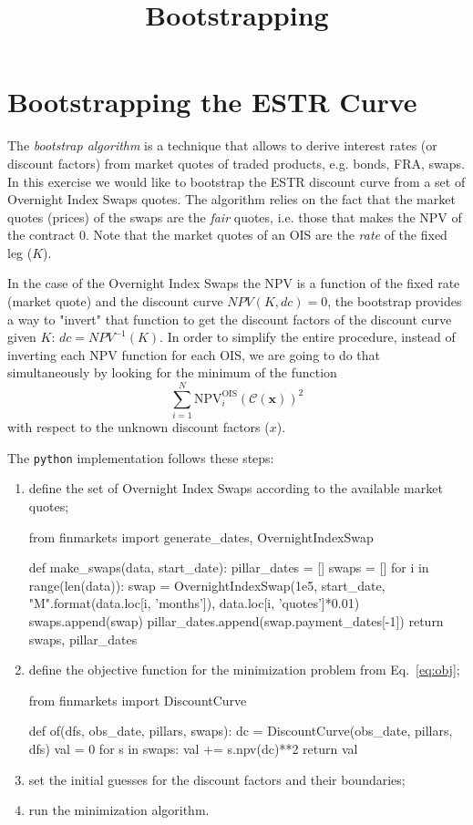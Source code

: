 \documentclass[]{article}
\title{Bootstrapping}
\author{}
\begin{document}
\maketitle

\section{Bootstrapping the ESTR Curve}
The \emph{bootstrap algorithm} is a technique that allows to derive interest rates (or discount factors) from market quotes of traded products, e.g. bonds, FRA, swaps.
In this exercise we would like to bootstrap the ESTR discount curve from a set of Overnight Index Swaps quotes. The algorithm relies on the fact that the market quotes (prices) of the swaps are the \emph{fair} quotes, i.e. those that makes the NPV of the contract 0. Note that the market quotes of an OIS are the \emph{rate} of the fixed leg ($K$). 

In the case of the Overnight Index Swaps the NPV is a function of the fixed rate (market quote) and the discount curve $NPV(K, dc)=0$, the bootstrap provides a way to "invert" that function to get the discount factors of the discount curve given $K$: $dc = NPV^{-1}(K)$.
In order to simplify the entire procedure, instead of inverting each NPV function for each OIS, we are going to do that simultaneously by looking for the minimum of the function 
\begin{equation}
\sum_{i=1}^{N}\mathrm{NPV}^\mathrm{OIS}_i( \mathcal{C}(\mathbf{x}))^2
\label{eq:obj}
\end{equation}
with respect to the unknown discount factors ($x$).

The \texttt{python} implementation follows these steps:
\begin{enumerate}
	\item define the set of Overnight Index Swaps according to the available market quotes;
\begin{ipython}
from finmarkets import generate_dates, OvernightIndexSwap

def make_swaps(data, start_date):
    pillar_dates = []
    swaps = []
    for i in range(len(data)):
        swap = OvernightIndexSwap(1e5, start_date,
                                  "{}M".format(data.loc[i, 'months']),
                                  data.loc[i, 'quotes']*0.01)
        swaps.append(swap)
        pillar_dates.append(swap.payment_dates[-1])
    return swaps, pillar_dates
\end{ipython}
	
	\item define the objective function for the minimization problem from Eq.~\ref{eq:obj};
\begin{ipython}
from finmarkets import DiscountCurve

def of(dfs, obs_date, pillars, swaps):
    dc = DiscountCurve(obs_date, pillars, dfs)
    val = 0
    for s in swaps:
        val += s.npv(dc)**2
    return val
\end{ipython}
	\item set the initial guesses for the discount factors and their boundaries;
	\item run the minimization algorithm.
\end{enumerate}
\end{document}
